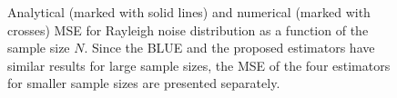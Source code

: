\documentclass{article}
\begin{document}
\begin{figure}[!ht]
\begin{minipage}[t]{1\linewidth}
{	\label{fig:rayleigh_blue_order_all}}
\hfil
{}
\caption{Analytical (marked with solid lines) and numerical (marked with crosses) MSE for Rayleigh noise distribution as a function of the sample size $N$.  Since the BLUE and the proposed estimators have similar results for large sample sizes, the MSE of the four estimators for smaller sample sizes are presented separately.}
\label{fig:rayleigh_blue_order}
	\end{minipage} 
\end{figure}
%
%
%
%
%
%
\end{document}
